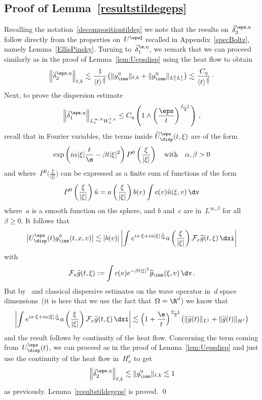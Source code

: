 \subsection{Proof of Lemma~\ref{resultstildegeps}}\label{proofstrichartz}

Recalling the notation~\eqref{decompositiontildeg} we note that the results on~$ \bar \delta^{\eps,\eta}_2$ follow directly from the properties on~$U^{\eps \sharp}$ recalled in Appendix~\ref{specBoltz}, namely Lemma~\ref{EllisPinsky}. Turning to~$ \bar \delta^{\e,\eta}_1$, we remark that we can proceed similarly as in the proof of Lemma~\ref{lem:Uepsdisp} using the heat flow to obtain
\begin{equation}\label{eq:deltabar2}
\left\|\bar \delta^{\eps,\eta}_2\right\|_{\ell,k} \lesssim \frac{1}{\langle t \rangle^{\frac d4}} \big(\|g_{\inn}^\eta\|_{\ell,k} + \|g_{\inn}^\eta\|_{L^2_vL^1_x} \big) \lesssim \frac{C_\eta}{\langle t \rangle^\frac d4} \, \cdotp
\end{equation}
Next, to prove the dispersion estimate
\[
\left\|\bar \delta^{\eps,\eta}_1\right\|_{L^{\infty,k}_v W^{\ell,x}_x} \le C_\eta \left(1 \wedge \left(\frac{\eps}{t}\right)^{\frac{d-1}{2}} \right) \,,
\]
recall that in Fourier variables, the terms inside $\widehat U^\eps_{\disp}(t,\xi)$ are of the form
\[
\exp \left(i\alpha |\xi| \frac t\e - \beta t |\xi|^2 \right)P^0\left(\frac\xi{|\xi|}\right) \quad \text{with} \quad \alpha, \beta >0
\]
and where~$P^0\big(\frac\xi{|\xi|}\big)$ can be expressed as a finite sum of functions of the form
\[
P^0\left(\frac\xi{|\xi|}\right)\hat u = a\left(\frac\xi{|\xi|}\right)b(v)\int c(v)\hat u (\xi,v)\,\dv
\]
where~$a$ is a smooth function on the sphere, and $b$ and~$c$ are in~$L^{\infty,\beta}$ for all~$\beta \geq 0$. It follows that
\[
\big |U^\eps_{\disp}(t) g^\eta_{{\inn}} (t,x,v)\big| \lesssim |b(v)| \left| \int e^{ix\cdot \xi + {i\alpha |\xi| \frac t\e}} a\left(\frac\xi{|\xi|}\right) {\mathcal F}_x \widetilde g (t,\xi)\, \dxi \right|
\]
with
\[
{\mathcal F}_x \widetilde g (t,\xi):= \int c(v)e^{- \beta t |\xi|^2}\widehat g_{\inn} (\xi,v)\,\dv \,.
\]
But by~\cite{Ukai} and classical dispersive estimates on the wave operator in~$d$ space dimensions~(it is here that we use the fact that~$\Omega = \R^d$) we know that
\[
\left| \int e^{ix\cdot \xi + {i\alpha |\xi| \frac t\e}} a\left(\frac\xi{|\xi|}\right) {\mathcal F}_x\widetilde g(t,\xi)\, \dxi
\right|
\lesssim \Big(1+\frac\e t\Big)^{\frac{d-1}2} \big(\| \widetilde g(t)\|_{L^1} + \| \widetilde g(t)\|_{H^\ell}\big)
\]
and the result follows by continuity of the heat flow. Concerning the term coming from~$U^\eps_{\disp}(t)$, we can proceed as in the proof of Lemma~\ref{lem:Uepsdisp} and just use the continuity of the heat flow in~$H^\ell_x$ to get
\[
\left\|\bar \delta^{\eps,\eta}_2\right\|_{\ell,k} \lesssim \|g_{\inn}^\eta\|_{\ell,k} \lesssim 1
\]
as previously. Lemma~\ref{resultstildegeps} is proved.
\qed


